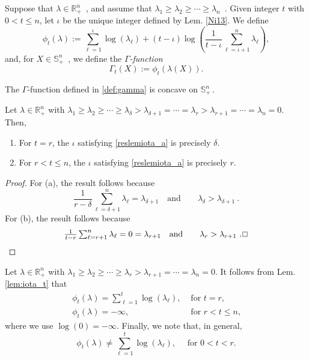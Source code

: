 \documentclass[smallextended]{svjour3hack}       %
\makeatletter
\providecommand{\openbox}{\leavevmode
  \hbox to.77778em{%
  \hfil\vrule
  \vbox to.575em{\hrule width.5em\vfil\hrule}%
  \vrule\hfil}}
\DeclareRobustCommand{\qed}{%
  \ifmmode
    \eqno \def\@badmath{$$}%
    \let\eqno\relax \let\leqno\relax \let\veqno\relax
    \hbox{\openbox}%
  \else
    \leavevmode\unskip\penalty9999 \hbox{}\nobreak\hfill
    \quad\hbox{\openbox}%
  \fi
}
\makeatother
\begin{document}
Suppose that  $\lambda\in\mathbb{R}^n_+$~, and assume that 
$\lambda_1\geq\lambda_2\geq\cdots\geq\lambda_n$~. Given  integer $t$ with $0<t\leq n$,
let $\iota$ be the unique integer defined by Lem. \ref{Ni13}. We define
\begin{equation*}
\phi_t(\lambda):=\textstyle\sum_{\ell=1}^{\iota} \log\left(\lambda_\ell\right) + (t - \iota)\log\left(\frac{1}{t-{\iota}} \sum_{\ell=\iota+1}^{n}
\lambda_\ell\right),
\end{equation*}
and, for $X\in\mathbb{S}_{+}^n$~, we define the \emph{$\Gamma$-function}
\begin{equation}\label{def:gamma}
\Gamma_t(X):= \phi_t(\lambda(X)).
\end{equation}

\begin{proposition}\label{prop:gammaconc}{ \cite[Sec. 4.1]{Nikolov}}
    The $\Gamma$-function defined in \eqref{def:gamma} is  concave  on $\mathbb{S}_{+}^n$\,. 
\end{proposition}

\begin{lemma}\label{lem:iota_t}
 Let $\lambda\in\mathbb{R}_+^n$ with $\lambda_1\geq \lambda_2\geq \cdots\geq
 \lambda_\delta> \lambda_{\delta+1}=\cdots=
 \lambda_r>\lambda_{r+1}=\cdots
 =\lambda_n=0$.
 Then,%
 \vspace{-5pt}
 \begin{enumerate}
     \item[(a)] For $t=r$, the $\iota$ satisfying
 \eqref{reslemiota_a} is
 precisely $\delta$. 
 \item[(b)] For $r<t\leq n$, the $\iota$ satisfying
 \eqref{reslemiota_a} is
 precisely $r$. 
 \end{enumerate}
\end{lemma}

\begin{proof}
For (a), the result follows  because
\[
\textstyle\frac{1}{r-\delta}\sum_{\ell=\delta+1}^n \lambda_{\ell} = \lambda_{\delta+1} \quad\mbox{and}\qquad \lambda_\delta> \lambda_{\delta+1}~.
\]
For (b), the result follows because 
\[
\textstyle\frac{1}{t-r}\sum_{\ell=r+1}^n \lambda_{\ell} = 0 =\lambda_{r+1} \quad\mbox{and}\qquad \lambda_r> \lambda_{r+1}~. \qed
\]
\end{proof}

\begin{theorem}\label{cor:propphi}
Let $\lambda\in\mathbb{R}_+^n$ with $\lambda_1\geq \lambda_2\geq \cdots\geq
 \lambda_r>\lambda_{r+1}=\cdots
 =\lambda_n=0$. It follows from Lem. \ref{lem:iota_t} that  
 \[
 \begin{array}{ll}
 \phi_t(\lambda)=\sum_{\ell=1}^{t} \log\left(\lambda_\ell\right),& \mbox{  for $t= r$,}\\[2pt]
 \phi_t(\lambda)=-\infty, & \mbox{  for $r< t\leq n$,}
 \end{array}
 \]
 where we use $\log(0)=-\infty$. Finally, we note that, in general, 
 \[
 \textstyle\phi_{t}(\lambda)\neq \sum_{\ell=1}^{t} \log\left(\lambda_\ell\right), \quad \mbox{  for $0<t<r$.}
 \]  
\end{theorem}
\end{document}
